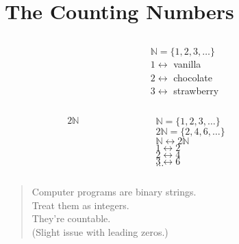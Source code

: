 \section{The Counting Numbers}

\begin{frame}
  \begin{columns}
    \begin{column}{0.3\textwidth}
      \centering
    \end{column}
    {\color{gmitgrey!30}\vrule{}} \hspace{0.1\textwidth}
    \begin{column}{0.5\textwidth}
      $\mathbb{N} = \{1,2,3,\ldots\}$ \\[8mm]
      $1 \leftrightarrow $ vanilla \\[8mm]
      $2 \leftrightarrow $ chocolate \\[8mm]
      $3 \leftrightarrow $ strawberry \\[8mm]
    \end{column}
  \end{columns}
\end{frame}


\begin{frame}
  \begin{columns}
    \begin{column}{0.3\textwidth}
      \color{gmitblue} \fontsize{30}{10}
      \[2\mathbb{N}\]
    \end{column}
    {\color{gmitgrey!30}\vrule{}} \hspace{0.1\textwidth}
    \begin{column}{0.5\textwidth}
      $\mathbb{N} = \{1,2,3,\ldots\}$ \\[4mm]
      $2\mathbb{N} = \{2,4,6,\ldots\}$ \\[4mm]
      $\mathbb{N} \leftrightarrow 2 \mathbb{N}$ \\[8mm]
      $1 \leftrightarrow 2$ \\[4mm]
      $2 \leftrightarrow 4$ \\[4mm]
      $3 \leftrightarrow 6$ \\[4mm]
      $\ldots$ \\[4mm]
    \end{column}
  \end{columns}
\end{frame}

\begin{frame}[standout]

\begin{quote}
  Computer programs are binary strings. \\[8mm]
  Treat them as integers. \\[8mm]
  They're countable. \\[8mm]
  (Slight issue with leading zeros.)
\end{quote}

\end{frame}
